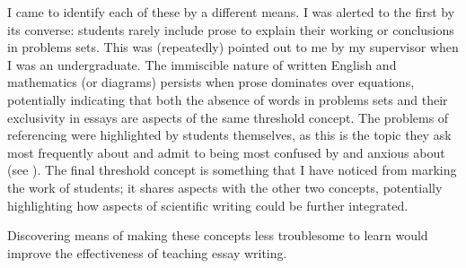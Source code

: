 I came to identify each of these by a different means. I was alerted to the first by its converse: students rarely include prose to explain their working or conclusions in problems sets. This was (repeatedly) pointed out to me by my supervisor when I was an undergraduate. The immiscible nature of written English and mathematics (or diagrams) persists when prose dominates over equations, potentially indicating that both the absence of words in problems sets and their exclusivity in essays are aspects of the same threshold concept. The problems of referencing were highlighted by students themselves, as this is the topic they ask most frequently about and admit to being most confused by and anxious about (see ). The final threshold concept is something that I have noticed from marking the work of students; it shares aspects with the other two concepts, potentially highlighting how aspects of scientific writing could be further integrated.

Discovering means of making these concepts less troublesome to learn would improve the effectiveness of teaching essay writing.
